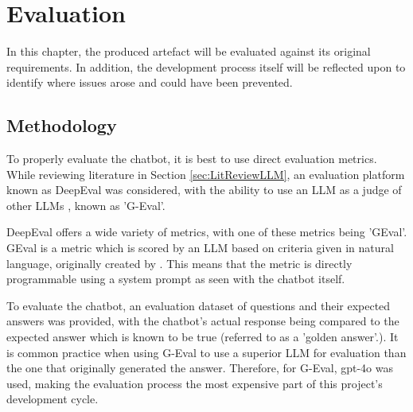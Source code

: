 \chapter{Evaluation}\label{ch:Evaluation}
In this chapter, the produced artefact will be evaluated against its original requirements.
In addition, the development process itself will be reflected upon to identify where issues arose 
and could have been prevented.

\section{Methodology}\label{sec:DeepEval}


\para To properly evaluate the chatbot, it is best to use direct evaluation metrics. While reviewing literature in Section 
\ref{sec:LitReviewLLM}, an evaluation platform known as DeepEval was considered, with the ability to use an LLM as a judge of 
other LLMs \autocite{deepeval_introduction_2024}, known as 'G-Eval'.

DeepEval offers a wide variety of metrics, with one of these metrics being 'GEval'. GEval is a metric which is scored by an LLM based 
on criteria given in natural language, originally created by \textcite{liuGEvalNLGEvaluation2023a}. This means that the metric is directly 
programmable using a system prompt as seen with the chatbot itself.

\para 
To evaluate the chatbot, an evaluation dataset of questions and their expected answers was provided, with the chatbot's actual response being
compared to the expected answer which is known to be true (referred to as a 'golden answer'.). It is common practice when using G-Eval to use a 
superior LLM for evaluation than the one that originally generated the answer. Therefore, for G-Eval, gpt-4o was used, making the evaluation process 
the most expensive part of this project's development cycle. 


